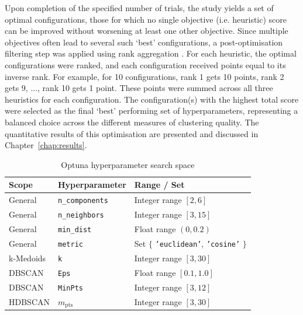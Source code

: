 \documentclass[10pt,oneside]{report}
\begin{document}
Upon completion of the specified number of trials, the study yields a set of optimal configurations, those for which no single objective (i.e. heuristic) score can be improved without worsening at least one other objective. Since multiple objectives often lead to several such `best' configurations, a post-optimisation filtering step was applied using rank aggregation \cite{li2019comparative}. For each heuristic, the optimal configurations were ranked, and each configuration received points equal to its inverse rank. For example, for 10 configurations, rank 1 gets 10 points, rank 2 gets 9, ..., rank 10 gets 1 point. These points were summed across all three heuristics for each configuration. The configuration(s) with the highest total score were selected as the final `best' performing set of hyperparameters, representing a balanced choice across the different measures of clustering quality. The quantitative results of this optimisation are presented and discussed in Chapter~\ref{chap:results}.


\begin{table}[htbp]
    \fontsize{8}{11}\selectfont %
    \centering
    \caption{Optuna hyperparameter search space} %
    \label{tab:hypreal}
    \renewcommand{\arraystretch}{1.2} %
    \begin{tabularx}{\textwidth}{l l X}
        \toprule %
        \textbf{Scope} & \textbf{Hyperparameter} & \textbf{Range / Set} \\ %
        \midrule %
        General       & \texttt{n\_components} & Integer range $[2, 6]$ \\
        General       & \texttt{n\_neighbors}  & Integer range $[3, 15]$ \\
        General       & \texttt{min\_dist}     & Float range $(0, 0.2)$ \\
        General       & \texttt{metric}        & Set $\{$ \texttt{'euclidean'}, \texttt{'cosine'} $\}$ \\
        k-Medoids     & \texttt{k}             & Integer range $[3, 30]$ \\
        DBSCAN        & \texttt{Eps}           & Float range $[0.1, 1.0]$ \\
        DBSCAN        & \texttt{MinPts}        & Integer range $[3, 12]$ \\
        HDBSCAN       & $m_{\text{pts}}$       & Integer range $[3, 30]$ \\
        \bottomrule %
    \end{tabularx}
    \renewcommand{\arraystretch}{1.0} %
\end{table}
\end{document}

